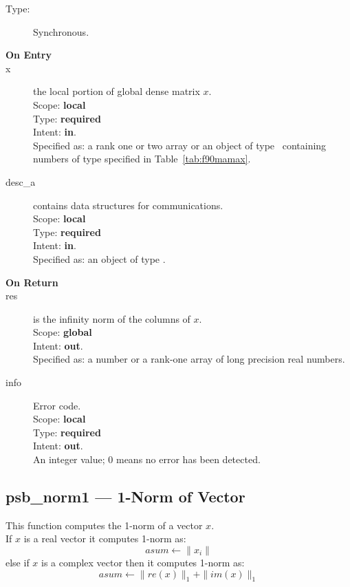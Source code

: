 \begin{description}
\item[Type:] Synchronous.
\item[\bf On Entry]
\item[x] the local portion of global dense matrix
$x$. \\
Scope: {\bf local} \\
Type: {\bf required} \\
Intent: {\bf in}.\\
Specified as: a rank one or two array or an object of type \vdata\
containing numbers of type specified in
Table~\ref{tab:f90mamax}.
\item[desc\_a] contains data structures for communications.\\
Scope: {\bf local} \\
Type: {\bf required}\\
Intent: {\bf in}.\\
Specified as: an object of type \descdata.
\item[\bf On Return]
\item[res] is the infinity norm of the columns of $x$.\\
Scope: {\bf global} \\
Intent: {\bf out}.\\
Specified as: a number or a rank-one array  of long precision real numbers.
\item[info] Error code.\\
Scope: {\bf local} \\
Type: {\bf required} \\
Intent: {\bf out}.\\
An integer value; 0 means no error has been detected.
\end{description}

%
%


\clearpage\subsection{psb\_norm1 --- 1-Norm of Vector}

This function computes the 1-norm of a vector $x$.\\
If $x$ is a real vector
it computes 1-norm as:
\[ asum \leftarrow  \|x_i\|\]
else if $x$ is a complex vector then it computes 1-norm  as:
\[ asum \leftarrow \|re(x)\|_1 + \|im(x)\|_1\]


